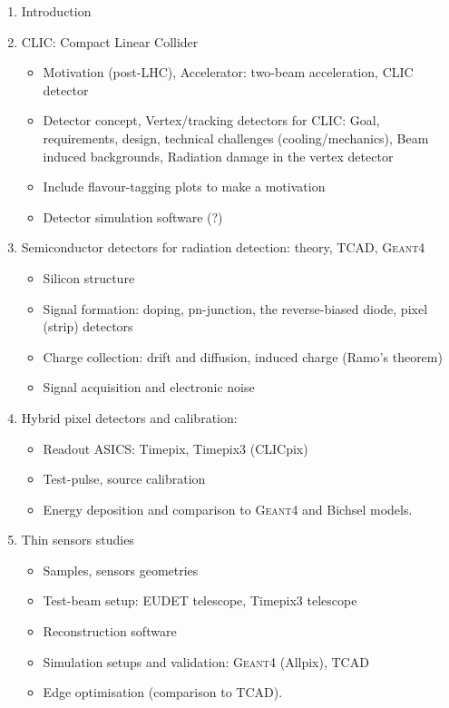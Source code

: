 

\begin{enumerate}

\item Introduction
\item CLIC: Compact Linear Collider
  \begin{itemize}
  \item Motivation (post-LHC), Accelerator: two-beam acceleration, CLIC detector
  \item Detector concept, Vertex/tracking detectors for CLIC: Goal, requirements,
    design, technical challenges (cooling/mechanics), Beam induced
    backgrounds, Radiation damage in the vertex detector
  \item Include flavour-tagging plots to make a motivation
  \item Detector simulation software (?)
  \end{itemize}
  
\item Semiconductor detectors for radiation detection: theory, TCAD, \textsc{Geant4}
  \begin{itemize}
  \item Silicon structure
  \item Signal formation: doping, pn-junction, the
    reverse-biased diode, pixel (strip) detectors
  \item Charge collection: drift and diffusion, induced charge (Ramo's
    theorem)
  \item Signal acquisition and electronic noise
  \end{itemize}

\item Hybrid pixel detectors and calibration:
  \begin{itemize}
  \item Readout ASICS: Timepix, Timepix3 (CLICpix)
  \item Test-pulse, source calibration 
  \item Energy deposition and comparison to \textsc{Geant4} and Bichsel models.
  \end{itemize}

\item Thin sensors studies
  \begin{itemize}
  \item Samples, sensors geometries
  \item Test-beam setup: EUDET telescope, Timepix3 telescope
  \item Reconstruction software
  \item Simulation setups and validation: \textsc{Geant4} (Allpix), TCAD 
  \item Edge optimisation (comparison to TCAD).
  \end{itemize}



\end{enumerate}
